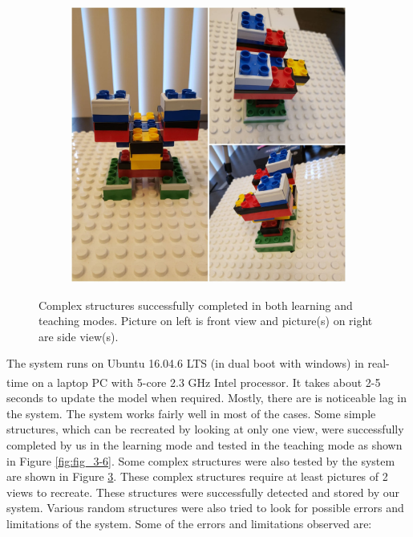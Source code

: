 \begin{figure}[H]
\begin{subfigure}{0.5\textwidth}
       \caption[{}]{\label{fig:fig_3-7d}}
    \end{subfigure}
    \begin{subfigure}{0.5\textwidth}
       \centering
       \includegraphics[width=0.8\linewidth]{figures/e7.jpg}
      
       \caption[{}]{ \label{fig:fig_3-7e}}
    \end{subfigure}
    \caption[{Complex 3D structures}]{Complex structures successfully completed in both learning and teaching modes. Picture on left is front view and picture(s) on right are side view(s).}
   \label{fig:fig_3-7}
\end{figure}
The system runs on Ubuntu 16.04.6 LTS (in dual boot with windows) in real-time on a laptop PC with 5-core 2.3 GHz Intel\textsuperscript\textregistered{} processor. It takes about 2-5 seconds to update the model when required. Mostly, there are is noticeable lag in the system. The system works fairly well in most of the cases. Some simple structures, which can be recreated by looking at only one view, were successfully completed by us in the learning mode and tested in the teaching mode as shown in Figure \ref{fig:fig_3-6}. Some complex structures were also tested by the system are shown in Figure \ref{fig:fig_3-7}. These complex structures require at least pictures of 2 views to recreate. These structures were successfully detected and stored by our system. Various random structures were also tried to look for possible errors and limitations of the system. Some of the errors and limitations observed are:

